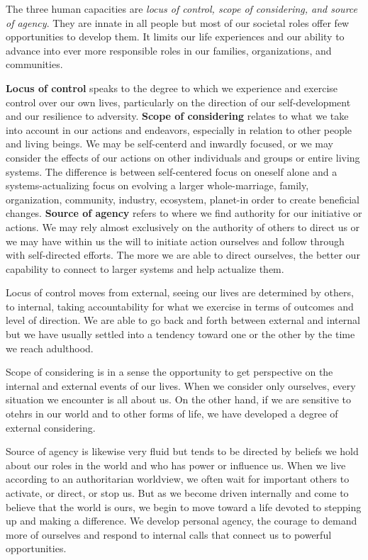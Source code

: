 \documentclass[ebook,12pt,oneside,openany]{memoir}
\begin{document}
The three human capacities are \textit{locus of control, scope of considering, and source of agency}.
They are innate in all people but most of our societal roles offer few opportunities to develop them.
It limits our life experiences and our ability to advance into ever more responsible roles in our families, organizations, and communities.

\textbf{Locus of control} speaks to the degree to which we experience and exercise control over our own lives, particularly on the direction of our self-development and our resilience to adversity.
\textbf{Scope of considering} relates to what we take into account in our actions and endeavors, especially in relation to other people and living beings.
We may be self-centerd and inwardly focused, or we may consider the effects of our actions on other individuals and groups or entire living systems.
The difference is between self-centered focus on oneself alone and a systems-actualizing focus on evolving a larger whole-marriage, family, organization, community, industry, ecosystem, planet-in order to create beneficial changes.
\textbf{Source of agency} refers to where we find authority for our initiative or actions. We may rely almost exclusively on the authority of others to direct us or we may have within us the will to initiate action ourselves and follow through with self-directed efforts.
The more we are able to direct ourselves, the better our capability to connect to larger systems and help actualize them.

Locus of control moves from external, seeing our lives are determined by others, to internal, taking accountability for what we exercise in terms of outcomes and level of direction.
We are able to go back and forth between external and internal but we have usually settled into a tendency toward one or the other by the time we reach adulthood.

Scope of considering is in a sense the opportunity to get perspective on the internal and external events of our lives.
When we consider only ourselves, every situation we encounter is all about us. On the other hand, if we are sensitive to otehrs in our world and to other forms of life, we have developed a degree of external considering.

Source of agency is likewise very fluid but tends to be directed by beliefs we hold about our roles in the world and who has power or influence us.
When we live according to an authoritarian worldview, we often wait for important others to activate, or direct, or stop us. 
But as we become driven internally and come to believe that the world is ours, we begin to move toward a life devoted to stepping up and making a difference. We develop personal agency, the courage to demand more of ourselves and respond to internal calls that connect us to powerful opportunities.
\end{document}

